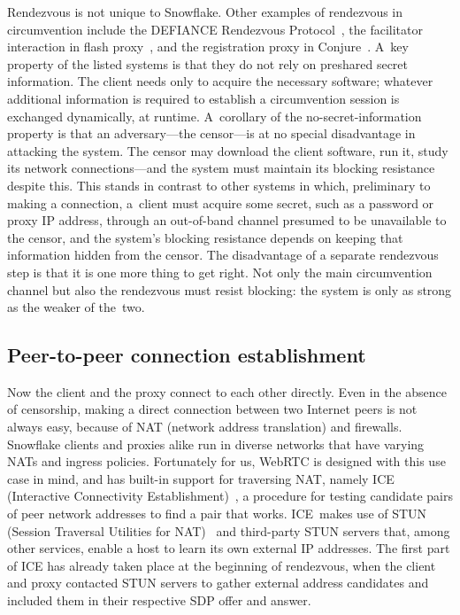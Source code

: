 \documentclass[letterpaper,twocolumn]{article}
\begin{document}
Rendezvous is not unique to Snowflake.
Other examples of rendezvous in circumvention include
the DEFIANCE Rendezvous Protocol~\cite[\S 3]{Lincoln2012a},
the facilitator interaction in flash proxy~\cite[\S 3]{Fifield2012a},
and the registration proxy in Conjure~\cite[\S 4.1]{Frolov2019b}.
A~key property of the listed systems
is that they do not rely on preshared secret information.
The client needs only to acquire the necessary software;
whatever additional information is required to establish a circumvention session
is exchanged dynamically, at runtime.
A~corollary of the no-secret-information property
is that an adversary---the censor---is
at no special disadvantage in attacking the system.
The censor may download the client software,
run it, study its network connections---and
the system must maintain its blocking resistance despite this.
This stands in contrast to other systems in which,
preliminary to making a connection,
a~client must acquire some secret,
such as a password or proxy IP address,
through an out-of-band channel
presumed to be unavailable to the censor,
and the system's blocking resistance depends on
keeping that information hidden from the censor.
The disadvantage of a separate rendezvous step
is that it is one more thing to get right.
Not only the main circumvention channel
but also the rendezvous must resist blocking:
the system is only as strong as the weaker of the~two.

\subsection{Peer-to-peer connection establishment}
\label{sec:connection}

Now the client and the proxy connect to each other directly.
Even in the absence of censorship,
making a direct connection between two Internet peers is not always easy,
because of NAT (network address translation) and firewalls.
Snowflake clients and proxies alike run in diverse networks
that have varying NATs and ingress policies.
Fortunately for us,
WebRTC is designed with this use case in mind,
and has built-in support for traversing NAT, namely
ICE (Interactive Connectivity Establishment)~\cite{rfc8445},
a procedure for testing candidate pairs of peer network addresses
to find a pair that works.
ICE~makes use of
STUN (Session Traversal Utilities for NAT)~\cite{rfc8489}
and third-party STUN servers that, among other services,
enable a host to learn its own external IP addresses.
The first part of ICE has already taken place at the beginning of rendezvous,
when the client and proxy contacted STUN servers to gather
external address candidates and included them in their respective
SDP offer and answer.
\end{document}
